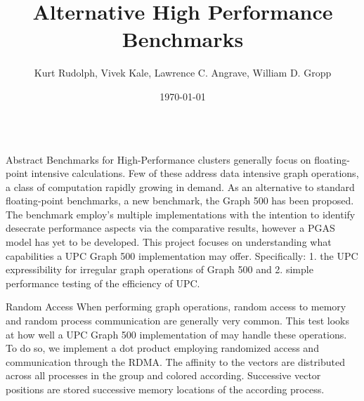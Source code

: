 \documentclass[final]{beamer}
\title{Alternative High Performance Benchmarks}
\author{Kurt Rudolph, Vivek Kale, Lawrence C. Angrave, William D. Gropp}
\institute{Department of Computer Science, University of Illinois Urbana-Champaign}
\date{\today}
\begin{document}
	\begin{frame}[t]
		\begin{columns}[t] 
			  \begin{column}{0.60\paperwidth} 
				\begin{alertblock}{Abstract}
					Benchmarks for High-Performance clusters generally focus on floating-point intensive calculations. Few of these address data intensive graph operations, a class of computation rapidly growing in demand.  As an alternative to standard floating-point benchmarks, a new benchmark, the Graph 500 has been proposed. The benchmark employ's multiple implementations with the intention to identify desecrate performance aspects via the comparative results, however a PGAS model has yet to be developed. This project focuses on understanding what capabilities a UPC Graph 500 implementation may offer. Specifically: 1. the UPC expressibility for irregular graph operations of Graph 500 and 2. simple performance testing of the efficiency of UPC.
				\end{alertblock}
				\begin{block}{Random Access}
					When performing graph operations, random access to memory and random process communication are generally very common.  This test looks at how well a UPC Graph 500 implementation of may handle these operations.  To do so, we implement a dot product employing randomized access and communication through the RDMA.   The affinity to the vectors are distributed across all processes in the group and colored according.  Successive vector positions are stored successive memory locations of the according process.  
				\end{block}
				\begin{columns}[t,totalwidth=0.60\paperwidth]
					\begin{column}{0.28\paperwidth}
						
					\end{column}
					\begin{column}{0.28\paperwidth}
						\begin{columns}[t,totalwidth=0.28\paperwidth]
							\begin{column}{0.12\paperwidth}

\end{column}
\end{columns}
\end{column}
\end{columns}
\end{column}
\end{columns}
\end{frame}
\end{document}
